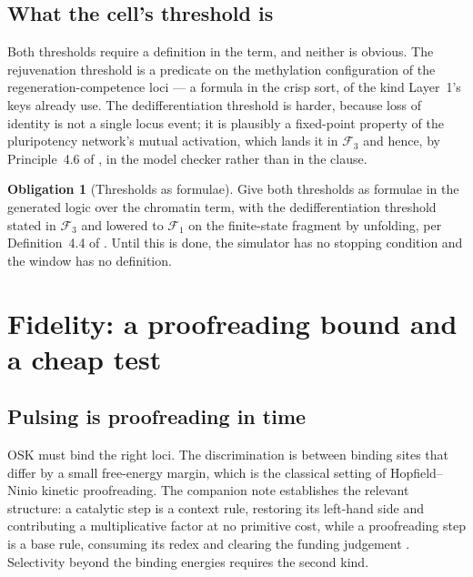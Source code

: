 \documentclass[11pt,a4paper]{article}
\theoremstyle{plain}
\theoremstyle{definition}
\newtheorem{obligation}[theorem]{Obligation}
\theoremstyle{remark}
\begin{document}
\subsection{What the cell's threshold is}

Both thresholds require a definition in the term, and neither is obvious. The
rejuvenation threshold is a predicate on the methylation configuration of the
regeneration-competence loci --- a formula in the crisp sort, of the kind
Layer~1's keys already use. The dedifferentiation threshold is harder, because
loss of identity is not a single locus event; it is plausibly a fixed-point
property of the pluripotency network's mutual activation, which lands it in
$\mathcal{F}_3$ and hence, by Principle~4.6 of \cite{Interventions}, in the
model checker rather than in the clause.

\begin{obligation}[Thresholds as formulae]\label{ob:thresh}
Give both thresholds as formulae in the generated logic over the chromatin
term, with the dedifferentiation threshold stated in $\mathcal{F}_3$ and
lowered to $\mathcal{F}_1$ on the finite-state fragment by unfolding, per
Definition~4.4 of \cite{Interventions}. Until this is done, the simulator has
no stopping condition and the window has no definition.
\end{obligation}

\section{Fidelity: a proofreading bound and a cheap test}\label{sec:fidelity}

\subsection{Pulsing is proofreading in time}

OSK must bind the right loci. The discrimination is between binding sites that
differ by a small free-energy margin, which is the classical setting of
Hopfield--Ninio kinetic proofreading. The companion note establishes the
relevant structure: a catalytic step is a context rule, restoring its
left-hand side and contributing a multiplicative factor at no primitive cost,
while a proofreading step is a base rule, consuming its redex and clearing the
funding judgement \cite{Proofreading}. Selectivity beyond the binding energies
requires the second kind.
\end{document}
